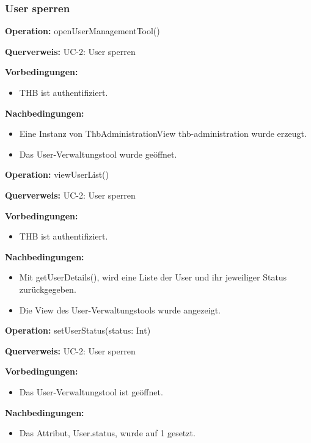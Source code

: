 \documentclass[a4paper,12pt]{article}
\begin{document}
	\subsubsection{User sperren}
	\begin{contractbox}
		\textbf{Operation:} openUserManagementTool()
		
			\textbf{Querverweis:} UC-2: User sperren
		
		\textbf{Vorbedingungen:}
		\begin{itemize}[noitemsep]
			\item THB ist authentifiziert.
		\end{itemize}
		
		\textbf{Nachbedingungen:}
		\begin{itemize}[noitemsep]
			\item Eine Instanz von ThbAdministrationView thb-administration wurde erzeugt.
			\item Das User-Verwaltungstool wurde geöffnet.
		\end{itemize}
	\end{contractbox}

	\begin{contractbox}
		\textbf{Operation:} viewUserList()
		
			\textbf{Querverweis:} UC-2: User sperren
		
		\textbf{Vorbedingungen:}
		\begin{itemize}[noitemsep]
			\item THB ist authentifiziert.
		\end{itemize}
		
		\textbf{Nachbedingungen:}
		\begin{itemize}[noitemsep]
			\item Mit getUserDetails(), wird eine Liste der User und ihr jeweiliger Status zurückgegeben.
			\item Die View des User-Verwaltungstools wurde angezeigt.
		\end{itemize}
	\end{contractbox}
	
	\begin{contractbox}
		\textbf{Operation:} setUserStatus(status: Int)
		
		\textbf{Querverweis:} UC-2: User sperren
		
		\textbf{Vorbedingungen:}
		\begin{itemize}[noitemsep]
			\item Das User-Verwaltungstool ist geöffnet.
		\end{itemize}
		
		\textbf{Nachbedingungen:}
		\begin{itemize}[noitemsep]
			\item Das Attribut, User.status, wurde auf 1 gesetzt.
		\end{itemize}
	\end{contractbox}
\end{document}
